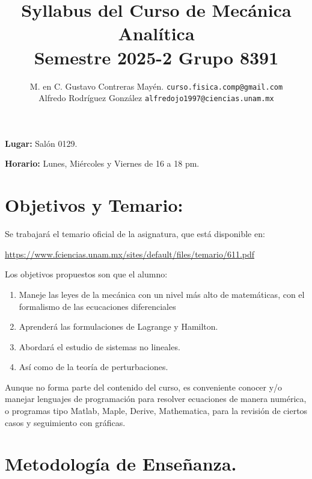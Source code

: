 \documentclass[hidelinks,12pt]{article}
\author{M. en C. Gustavo Contreras Mayén. \texttt{curso.fisica.comp@gmail.com}\\
Alfredo Rodríguez González \texttt{alfredojo1997@ciencias.unam.mx}}
\title{Syllabus del Curso de Mecánica Analítica \\ {\large Semestre 2025-2 Grupo 8391}}
\date{ }
\renewcommand\labelenumii{\theenumi.{\arabic{enumii}})}
\begin{document}
\renewcommand\labelenumii{\theenumi.{\arabic{enumii}}}
\maketitle
\fontsize{12}{12}\selectfont

\textbf{Lugar: } Salón 0129.
\par
\textbf{Horario: } Lunes, Miércoles y Viernes de 16 a 18 pm.
\par
\par
\section{Objetivos y Temario:}

Se trabajará el temario oficial de la asignatura, que está disponible en:

\href{https://www.fciencias.unam.mx/sites/default/files/temario/611.pdf}{https://www.fciencias.unam.mx/sites/default/files/temario/611.pdf}

Los objetivos propuestos son que el alumno:
\begin{enumerate}
    \item Maneje las leyes de la mecánica con un nivel más alto de matemáticas, con el formalismo de las ecucaciones diferenciales
    \item Aprenderá las formulaciones de Lagrange y Hamilton.
    \item Abordará el estudio de sistemas no lineales.
    \item Así como de la teoría de perturbaciones.
\end{enumerate}
Aunque no forma parte del contenido del curso, es conveniente conocer y/o manejar lenguajes de programación para resolver ecuaciones de manera numérica, o programas tipo Matlab, Maple, Derive, Mathematica, para la revisión de ciertos casos y seguimiento con gráficas.

\section{Metodología de Enseñanza.}
\end{document}
